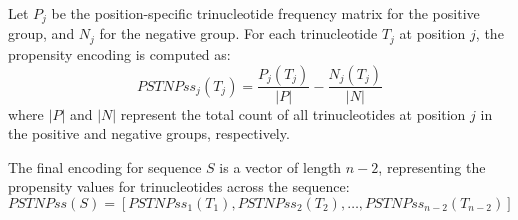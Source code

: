       Let $P_j$ be the position-specific trinucleotide frequency matrix for the positive group, and $N_j$ for the negative group.
      For each trinucleotide $T_j$ at position $j$, the propensity encoding is computed as:
      \[
        PSTNPss_j(T_j) = \frac{P_j(T_j)}{|P|} - \frac{N_j(T_j)}{|N|}
      \]
      where $|P|$ and $|N|$ represent the total count of all trinucleotides at position $j$ in the positive and negative groups, respectively.

      The final encoding for sequence $S$ is a vector of length $n-2$, representing the propensity values for trinucleotides across the sequence:
      \[
        PSTNPss(S) = [PSTNPss_1(T_1), PSTNPss_2(T_2), \dots, PSTNPss_{n-2}(T_{n-2})]
      \]
